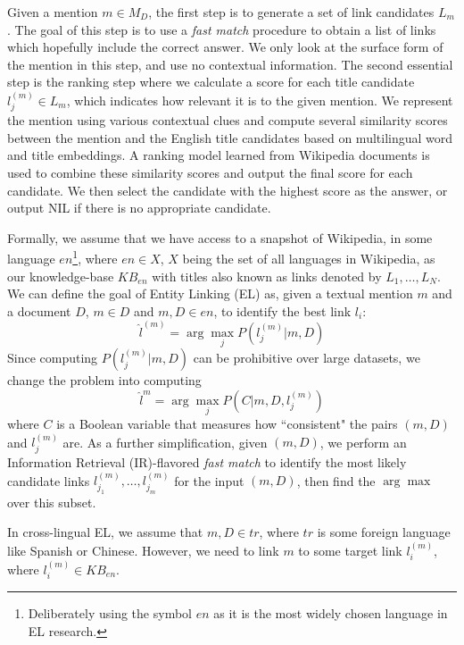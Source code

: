 \documentclass[letterpaper]{article} \usepackage{aaai18}  \usepackage{times}  \usepackage{helvet}  \usepackage{courier}  \usepackage{url}  \usepackage{graphicx}  \frenchspacing  \setlength{\pdfpagewidth}{8.5in}  \setlength{\pdfpageheight}{11in}  \usepackage{latexsym}
\begin{document}
Given a mention $m \in M_D$, the first step is to generate
a set of link candidates $L_m$. The goal of this
step is to use a {\em fast match} procedure to obtain a list of links which hopefully include the correct answer. We only look at the surface
form of the mention in this step, and use no contextual
information.
The second essential step is the ranking step where
we calculate a score for each title candidate $l_j^{(m)} \in L_m$,
which indicates how relevant it is to the given mention. We represent the mention using various contextual
clues and compute several similarity scores
between the mention and the English title candidates
based on multilingual word and title embeddings. A
ranking model learned from Wikipedia documents is
used to combine these similarity scores and output
the final score for each candidate. We then select
the candidate with the highest score as the answer,
or output NIL if there is no appropriate candidate.

Formally, we assume that we have access to a snapshot of Wikipedia, in some language $en$\footnote{Deliberately using the symbol $en$ as it is the most widely chosen language in EL research.}, where $en \in X$, $X$ being the set of all languages in Wikipedia,  as our knowledge-base $KB_{en}$ with titles also known as links denoted by ${L_1,\ldots,L_N}$. We can define the goal of Entity Linking (EL) as, given a textual mention $m$ and a document $D$, $m\in D$ and $m,D\in en$, to identify the best link $l_i$: 
\begin{equation}
\hat{l}^{(m)} = \arg\max_{j}P(l_j^{(m)}|m,D) \label{eq1}
\end{equation}
Since computing $P\left(l_j^{(m)}|m,D\right)$ can be prohibitive over large datasets, we change the problem into computing \begin{equation}
\hat{l}^{m}=\arg\max_j P(C|m,D,l_j^{(m)}) \label{hans-eq2}
\end{equation}
where $C$ is a Boolean variable that measures how ``consistent" the pairs $(m,D)$ and $l^{(m)}_j$ are. As a further simplification, given $(m,D)$, we perform an Information Retrieval (IR)-flavored \textit{fast match} to identify the most likely candidate links ${l^{(m)}_{j_1},\ldots,l^{(m)}_{j_m}}$ for the input $(m,D)$, then find the $\arg\max$ over this subset.

In cross-lingual EL, we assume that $m,D \in tr$, where $tr$ is some foreign language like Spanish or Chinese. However, we need to link $m$ to some target link $l^{(m)}_i$, where $l^{(m)}_i \in KB_{en}$.
\end{document}
